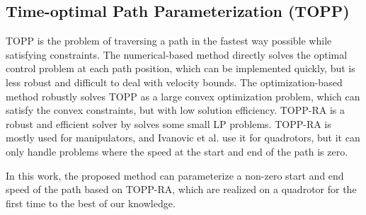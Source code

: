 \subsection{Time-optimal Path Parameterization (TOPP)}

TOPP is the problem of traversing a path in the fastest way possible while satisfying constraints. The numerical-based method \cite{pham2014general} directly solves the optimal control problem at each path position, which can be implemented quickly, but is less robust and difficult to deal with velocity bounds.
The optimization-based method \cite{verscheure2009time} robustly solves TOPP as a large convex optimization problem, which can satisfy the convex constraints, but with low solution efficiency.
TOPP-RA \cite{pham2018new} is a robust and efficient solver by solves some small LP problems.
TOPP-RA is mostly used for manipulators, and Ivanovic et al. \cite{ivanovic2022parabolic} use it for quadrotors, but it can only handle problems where the speed at the start and end of the path is zero. 

In this work, the proposed method can parameterize a non-zero start and end speed of the path based on TOPP-RA, which are realized on a quadrotor for the first time to the best of our knowledge.

%
